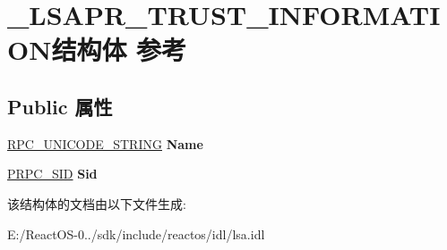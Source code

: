 \hypertarget{struct___l_s_a_p_r___t_r_u_s_t___i_n_f_o_r_m_a_t_i_o_n}{}\section{\+\_\+\+L\+S\+A\+P\+R\+\_\+\+T\+R\+U\+S\+T\+\_\+\+I\+N\+F\+O\+R\+M\+A\+T\+I\+O\+N结构体 参考}
\label{struct___l_s_a_p_r___t_r_u_s_t___i_n_f_o_r_m_a_t_i_o_n}
\subsection*{Public 属性}
\begin{DoxyCompactItemize}
\item 
\mbox{\label{struct___l_s_a_p_r___t_r_u_s_t___i_n_f_o_r_m_a_t_i_o_n_abf8d212c25ece675dd42c3a9a2921767}} 
\hyperlink{struct___r_p_c___u_n_i_c_o_d_e___s_t_r_i_n_g}{R\+P\+C\+\_\+\+U\+N\+I\+C\+O\+D\+E\+\_\+\+S\+T\+R\+I\+NG} {\bfseries Name}
\item 
\mbox{\label{struct___l_s_a_p_r___t_r_u_s_t___i_n_f_o_r_m_a_t_i_o_n_a2a911ca32f3fdb4a70a03971a70d414d}} 
\hyperlink{struct___r_p_c___s_i_d}{P\+R\+P\+C\+\_\+\+S\+ID} {\bfseries Sid}
\end{DoxyCompactItemize}


该结构体的文档由以下文件生成\+:\begin{DoxyCompactItemize}
\item 
E\+:/\+React\+O\+S-\/0../sdk/include/reactos/idl/lsa.\+idl\end{DoxyCompactItemize}
